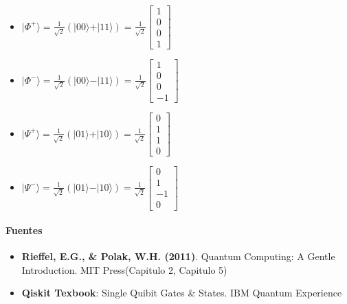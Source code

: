 \documentclass[11pt]{article}
\providecommand{\tightlist}{%
      \setlength{\itemsep}{0pt}\setlength{\parskip}{0pt}}
\begin{document}
\begin{itemize}
\tightlist
\item
  \(\vert\Phi^+\rangle = \frac{1}{\sqrt{2}}(\vert{00}\rangle + \vert{11}\rangle) = \frac{1}{\sqrt{2}}\begin{bmatrix} 1 \\ 0 \\ 0 \\ 1 \end{bmatrix}\)
\item
  \(\vert\Phi^-\rangle = \frac{1}{\sqrt{2}}(\vert{00}\rangle - \vert{11}\rangle) = \frac{1}{\sqrt{2}}\begin{bmatrix} 1 \\ 0 \\ 0 \\ -1 \end{bmatrix}\)
\item
  \(\vert\Psi^+\rangle = \frac{1}{\sqrt{2}}(\vert{01}\rangle + \vert{10}\rangle) = \frac{1}{\sqrt{2}}\begin{bmatrix} 0 \\ 1 \\ 1 \\ 0 \end{bmatrix}\)
\item
  \(\vert\Psi^-\rangle = \frac{1}{\sqrt{2}}(\vert{01}\rangle - \vert{10}\rangle) = \frac{1}{\sqrt{2}}\begin{bmatrix} 0 \\ 1 \\ -1 \\ 0 \end{bmatrix}\)
\end{itemize}

\paragraph{Fuentes}\label{fuentes}

\begin{itemize}
\tightlist
\item
  \textbf{Rieffel, E.G., \& Polak, W.H. (2011)}. Quantum Computing: A
  Gentle Introduction. MIT Press(Capitulo 2, Capitulo 5)
\item
  \textbf{Qiskit Texbook}: Single Quibit Gates \& States. IBM Quantum
  Experience
\end{itemize}
\end{document}
